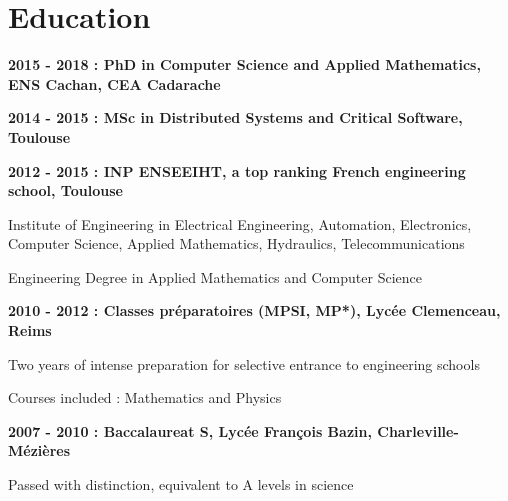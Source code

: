 \documentclass{article}
\renewenvironment{itemize}{
  \begin{list}{}{
      \setlength{\leftmargin}{1.5em}
      \setlength{\itemsep}{0.25em}
      \setlength{\parskip}{0pt}
      \setlength{\parsep}{0.25em}
    }
}{
  \end{list}
}
\begin{document}
\section*{Education}
\begin{itemize}
  	\item \textbf{2015 - 2018 : PhD in Computer Science and Applied Mathematics, ENS Cachan, CEA Cadarache}
	\item \textbf{2014 - 2015 : MSc in Distributed Systems and Critical Software, Toulouse}
    	\item \textbf{2012 - 2015 : INP ENSEEIHT, a top ranking French engineering school, Toulouse}
		\begin{itemize}
			\item Institute of Engineering in Electrical Engineering, Automation, Electronics, Computer Science, Applied Mathematics, Hydraulics, Telecommunications
			\item Engineering Degree in Applied Mathematics and Computer Science
		\end{itemize}
	\item \textbf{2010 - 2012 : Classes préparatoires (MPSI, MP*), Lycée Clemenceau, Reims}
		\begin{itemize}
			\item Two years of intense preparation for selective entrance to engineering schools
			\item Courses included : Mathematics and Physics
		\end{itemize}
	\item \textbf{2007 - 2010 : Baccalaureat S, Lycée François Bazin, Charleville-Mézières}
		\begin{itemize}
			\item Passed with distinction, equivalent to A levels in science
		\end{itemize}
\end{itemize}
\end{document}

